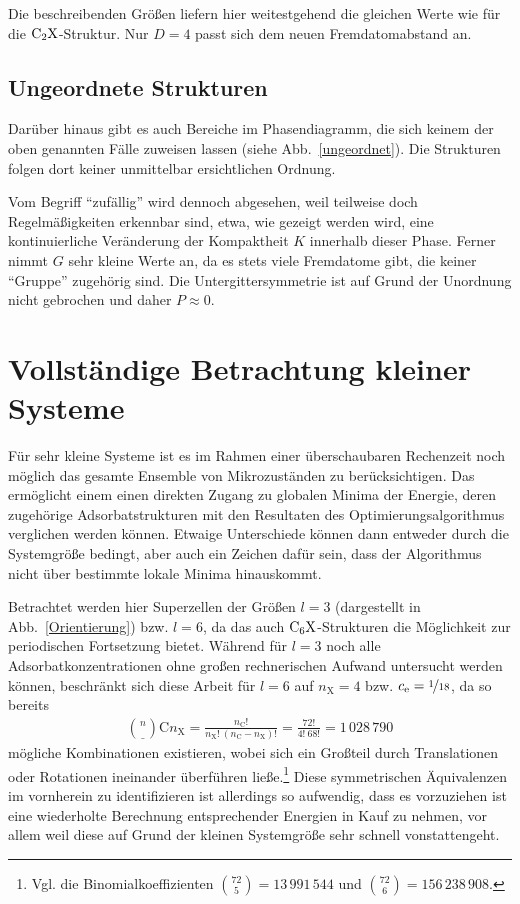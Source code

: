 \documentclass[a4paper, 10pt, twoside, openany]{book} %
\def \nC {n_\mathrm{C}}
\def \nX {n_\mathrm{X}}
\def \cE {c_\mathrm{e}}
\begin{document}
	Die beschreibenden Größen liefern hier weitestgehend die gleichen Werte wie für die $\rm C_2X$-Struktur. Nur $D = 4$ passt sich dem neuen Fremdatomabstand an.
	
	\subsection{Ungeordnete Strukturen}
	
	Darüber hinaus gibt es auch Bereiche im Phasendiagramm, die sich keinem der oben genannten Fälle zuweisen lassen (siehe Abb.~\ref{ungeordnet}). Die Strukturen folgen dort keiner unmittelbar ersichtlichen Ordnung.
	
	Vom Begriff "`zufällig"' wird dennoch abgesehen, weil teilweise doch Regelmäßigkeiten erkennbar sind, etwa, wie gezeigt werden wird, eine kontinuierliche Veränderung der Kompaktheit $K$ innerhalb dieser Phase. Ferner nimmt $G$ sehr kleine Werte an, da es stets viele Fremdatome gibt, die keiner "`Gruppe"' zugehörig sind. Die Untergittersymmetrie ist auf Grund der Unordnung nicht gebrochen und daher $P \approx 0$.
	
	\section{Vollständige Betrachtung kleiner Systeme}
	\label{kleine Systeme}
	
	Für sehr kleine Systeme ist es im Rahmen einer überschaubaren Rechenzeit noch möglich das gesamte Ensemble von Mikrozuständen zu berücksichtigen. Das ermöglicht einem einen direkten Zugang zu globalen Minima der Energie, deren zugehörige Adsorbatstrukturen mit den Resultaten des Optimierungsalgorithmus verglichen werden können. Etwaige Unterschiede können dann entweder durch die Systemgröße bedingt, aber auch ein Zeichen dafür sein, dass der Algorithmus nicht über bestimmte lokale Minima hinauskommt.
	
	Betrachtet werden hier Superzellen der Größen $l = 3$ (dargestellt in Abb.~\ref{Orientierung}) bzw. $l = 6$, da das auch $\rm C_6X$-Strukturen die Möglichkeit zur periodischen Fortsetzung bietet. Während für $l = 3$ noch alle Adsorbatkonzentrationen ohne großen rechnerischen Aufwand untersucht werden können, beschränkt sich diese Arbeit für $l = 6$ auf $\nX = 4$ bzw. $\cE = \nicefrac 1 {18}$, da so bereits
	\begin{align*}
		\binom \nC \nX = \frac{\nC!}{\nX! \ (\nC - \nX)!} = \frac{72!}{4! \ 68!} = 1 \, 028 \, 790
	\end{align*}
	mögliche Kombinationen existieren, wobei sich ein Großteil durch Translationen oder Rotationen ineinander überführen ließe.\footnote{Vgl. die Binomialkoeffizienten $\binom {72} 5 = 13 \, 991 \, 544$ und $\binom {72} 6 = 156 \, 238 \, 908$.} Diese symmetrischen Äquivalenzen im vornherein zu identifizieren ist allerdings so aufwendig, dass es vorzuziehen ist eine wiederholte Berechnung entsprechender Energien in Kauf zu nehmen, vor allem weil diese auf Grund der kleinen Systemgröße sehr schnell vonstattengeht.
	
\end{document}
